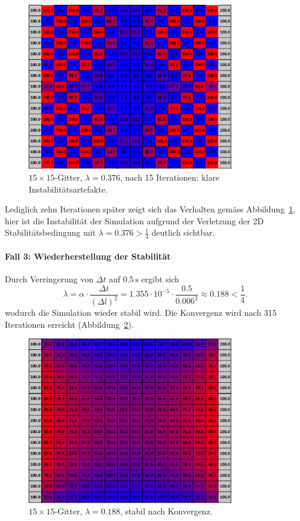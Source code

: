 \begin{figure}[htbp]
	\centering
	\includegraphics[width=0.8\textwidth]{papers/parallelisierung/images/simulation_15x15_0.376_15it.pdf}
	\caption{\(15\times 15\)-Gitter, \(\lambda = 0.376\), nach 15 Iterationen: klare Instabilitätsartefakte.}
	\label{parallelisierung:fig:simulation_15x15_0.376_15it}
\end{figure}

Lediglich zehn Iterationen später zeigt sich das Verhalten gemäss Abbildung~\ref{parallelisierung:fig:simulation_15x15_0.376_15it}, hier ist die Instabilität der Simulation aufgrund der Verletzung der 2D Stabilitätsbedingung mit \(\lambda = 0.376 > \frac{1}{4}\) deutlich sichtbar.

\paragraph{Fall 3: Wiederherstellung der Stabilität}  
Durch Verringerung von \(\Delta t\) auf \(0.5\,\mathrm{s}\) ergibt sich
\[
\lambda =
\alpha \cdot \frac{\Delta t}{(\Delta l)^2}
=
1.355\cdot 10^{-5} \cdot \frac{0.5}{0.006^2}
\approx 0.188 < \frac14.
\]
wodurch die Simulation wieder stabil wird. Die Konvergenz wird nach 315 Iterationen erreicht (Abbildung~\ref{parallelisierung:fig:simulation_15x15_0.188_konv}).

\begin{figure}[htbp]
	\centering
	\includegraphics[width=0.8\textwidth]{papers/parallelisierung/images/simulation_15x15_0.188_konv.pdf}
	\caption{\(15\times 15\)-Gitter, \(\lambda = 0.188\), stabil nach Konvergenz.}
	\label{parallelisierung:fig:simulation_15x15_0.188_konv}
\end{figure}

